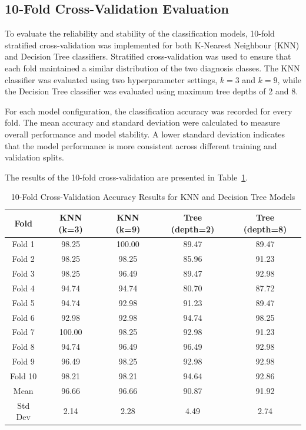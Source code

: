 \documentclass[a4paper,12pt]{article}
\begin{document}
\subsection{10-Fold Cross-Validation Evaluation}

To evaluate the reliability and stability of the classification models, 10-fold stratified cross-validation was implemented for both K-Nearest Neighbour (KNN) and Decision Tree classifiers. Stratified cross-validation was used to ensure that each fold maintained a similar distribution of the two diagnosis classes. The KNN classifier was evaluated using two hyperparameter settings, $k=3$ and $k=9$, while the Decision Tree classifier was evaluated using maximum tree depths of 2 and 8.

For each model configuration, the classification accuracy was recorded for every fold. The mean accuracy and standard deviation were calculated to measure overall performance and model stability. A lower standard deviation indicates that the model performance is more consistent across different training and validation splits.

The results of the 10-fold cross-validation are presented in Table~\ref{tab:cross_validation}.

\begin{table}[h]
	\centering
	\footnotesize
	\begin{tabular}{c c c c c}
		\hline
		\textbf{Fold} & \textbf{KNN (k=3)} & \textbf{KNN (k=9)} & 
		\textbf{Tree (depth=2)} & \textbf{Tree (depth=8)} \\
		\hline
		Fold 1  & 98.25 & 100.00 & 89.47 & 89.47 \\
		Fold 2  & 98.25 & 98.25  & 85.96 & 91.23 \\
		Fold 3  & 98.25 & 96.49  & 89.47 & 92.98 \\
		Fold 4  & 94.74 & 94.74  & 80.70 & 87.72 \\
		Fold 5  & 94.74 & 92.98  & 91.23 & 89.47 \\
		Fold 6  & 92.98 & 92.98  & 94.74 & 98.25 \\
		Fold 7  & 100.00 & 98.25 & 92.98 & 91.23 \\
		Fold 8  & 94.74 & 96.49  & 96.49 & 92.98 \\
		Fold 9  & 96.49 & 98.25  & 92.98 & 92.98 \\
		Fold 10 & 98.21 & 98.21 & 94.64 & 92.86 \\
		\hline
		Mean & 96.66 & 96.66 & 90.87 & 91.92 \\
		Std Dev & 2.14 & 2.28 & 4.49 & 2.74 \\
		\hline
	\end{tabular}
	\caption{10-Fold Cross-Validation Accuracy Results for KNN and Decision Tree Models}
	\label{tab:cross_validation}
\end{table}
\end{document}
